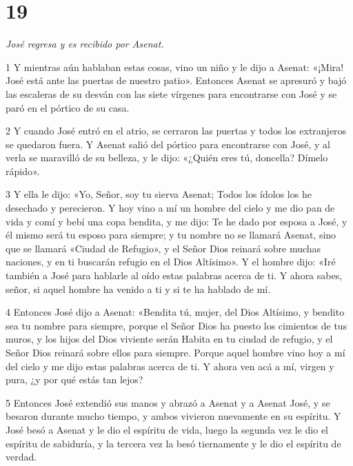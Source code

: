 \chapter{19}

\par \textit{José regresa y es recibido por Asenat.}

\par 1 Y mientras aún hablaban estas cosas, vino un niño y le dijo a Asenat: «¡Mira! José está ante las puertas de nuestro patio». Entonces Asenat se apresuró y bajó las escaleras de su desván con las siete vírgenes para encontrarse con José y se paró en el pórtico de su casa.

\par 2 Y cuando José entró en el atrio, se cerraron las puertas y todos los extranjeros se quedaron fuera. Y Asenat salió del pórtico para encontrarse con José, y al verla se maravilló de su belleza, y le dijo: «¿Quién eres tú, doncella? Dímelo rápido».

\par 3 Y ella le dijo: «Yo, Señor, soy tu sierva Asenat; Todos los ídolos los he desechado y perecieron. Y hoy vino a mí un hombre del cielo y me dio pan de vida y comí y bebí una copa bendita, y me dijo: Te he dado por esposa a José, y él mismo será tu esposo para siempre; y tu nombre no se llamará Asenat, sino que se llamará «Ciudad de Refugio», y el Señor Dios reinará sobre muchas naciones, y en ti buscarán refugio en el Dios Altísimo». Y el hombre dijo: «Iré también a José para hablarle al oído estas palabras acerca de ti. Y ahora sabes, señor, si aquel hombre ha venido a ti y si te ha hablado de mí.

\par 4 Entonces José dijo a Asenat: «Bendita tú, mujer, del Dios Altísimo, y bendito sea tu nombre para siempre, porque el Señor Dios ha puesto los cimientos de tus muros, y los hijos del Dios viviente serán Habita en tu ciudad de refugio, y el Señor Dios reinará sobre ellos para siempre. Porque aquel hombre vino hoy a mí del cielo y me dijo estas palabras acerca de ti. Y ahora ven acá a mí, virgen y pura, ¿y por qué estás tan lejos?

\par 5 Entonces José extendió sus manos y abrazó a Asenat y a Asenat José, y se besaron durante mucho tiempo, y ambos vivieron nuevamente en su espíritu. Y José besó a Asenat y le dio el espíritu de vida, luego la segunda vez le dio el espíritu de sabiduría, y la tercera vez la besó tiernamente y le dio el espíritu de verdad.

